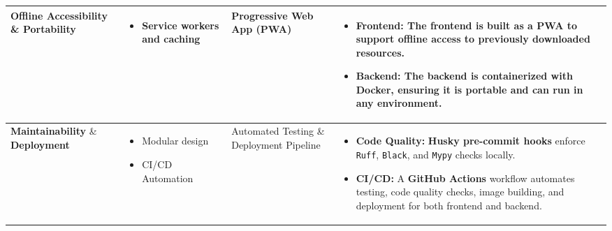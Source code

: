 \documentclass[11pt, a4paper]{article}
\begin{document}
\begin{longtable}{L{0.14\textwidth} L{0.2\textwidth} L{0.2\textwidth} L{0.36\textwidth}}
\textbf{Offline Accessibility} \& \textbf{Portability} &
\begin{itemize}[nosep, leftmargin=*]
    \item Service workers and caching
\end{itemize} &
Progressive Web App (PWA) &
\begin{itemize}[nosep, leftmargin=*]
    \item \textbf{Frontend:} The frontend is built as a PWA to support offline access to previously downloaded resources. 
    \item \textbf{Backend:} The backend is containerized with \textbf{Docker}, ensuring it is portable and can run in any environment.
\end{itemize} \\
\midrule

\textbf{Maintainability} \& \textbf{Deployment} &
\begin{itemize}[nosep, leftmargin=*]
    \item Modular design
    \item CI/CD Automation
\end{itemize} &
Automated Testing \& Deployment Pipeline &
\begin{itemize}[nosep, leftmargin=*]
    \item \textbf{Code Quality:} \textbf{Husky pre-commit hooks} enforce \texttt{Ruff}, \texttt{Black}, and \texttt{Mypy} checks locally.
    \item \textbf{CI/CD:} A \textbf{GitHub Actions} workflow automates testing, code quality checks, image building, and deployment for both frontend and backend.
\end{itemize} \\
\bottomrule

\end{longtable}
\end{document}
